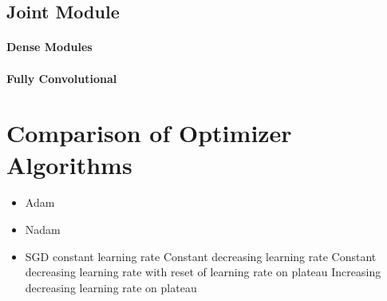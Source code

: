 \subsection{Joint Module }

\paragraph{Dense Modules}
\paragraph{Fully Convolutional}

\section{Comparison of Optimizer Algorithms}

\begin{itemize}
    \item Adam
    \item Nadam
    \item SGD
    \subitem constant learning rate
    \subitem Constant decreasing learning rate
    \subitem Constant decreasing learning rate with reset of learning rate on plateau
    \subitem Increasing decreasing learning rate on plateau
\end{itemize}

